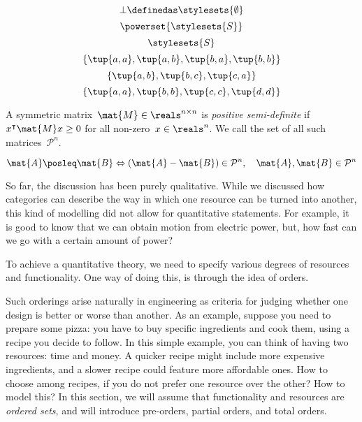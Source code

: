 {\begin{forslides}
\begin{equation*}
\end{equation*}
                \begin{equation*}
        \label{eq:pow_5}
        \bot \definedas \stylesets{\emptyset}
\end{equation*}
\begin{equation*}
        \label{eq:pow_6}
        \powerset{\stylesets{S}}
\end{equation*}
    \begin{equation*}
        \label{eq:pow_7}
        \stylesets{S}
\end{equation*}
    \begin{equation*}
        \label{eq:pre_ex1}
        \{\tup{a,a},\tup{a,b},\tup{b,a},\tup{b,b}\}
\end{equation*}
        \begin{equation*}
        \label{eq:pre_ex2}
        \{\tup{a,b},\tup{b,c},\tup{c,a}\}
\end{equation*}
            \begin{equation*}
        \label{eq:pre_ex3}
        \{\tup{a,a},\tup{b,b},\tup{c,c},\tup{d,d}\}
\end{equation*}
    \begin{definition}
        \label{def:posdef}
        A symmetric matrix~$\mat{M}\in \reals^{n\times n}$ is \emph{positive semi-definite} if~$x^\intercal \mat{M}x\geq 0$ for all non-zero~$x\in \reals^n$. We call the set of all such matrices~$\mathcal{P}^n$.
\end{definition}
    \begin{equation*}
        \label{eq:posdef_1}
        \mat{A}\posleq \mat{B} \Leftrightarrow (\mat{A}-\mat{B})\in \mathcal{P}^n, \quad \mat{A},\mat{B}\in \mathcal{P}^n
\end{equation*}
\end{forslides}}


So far, the discussion has been purely qualitative. While we discussed how
categories can describe the way in which one resource can be turned into another,
this kind of modelling did not allow for quantitative statements. For example, it
is good to know that we can obtain motion from electric power, but, how fast can
we go with a certain amount of power?

To achieve a quantitative theory, we need to specify various degrees of resources and functionality.
One way of doing this, is through the idea of orders.


Such orderings arise naturally in engineering as criteria for judging whether one design is better or worse than another.
As an example, suppose you need to prepare some pizza: you have to buy specific ingredients and cook them, using a recipe you decide to follow.
In this simple example, you can think of having two resources: time and money.
A quicker recipe might include more expensive ingredients, and a slower recipe could feature more affordable ones.
How to choose among recipes, if you do not prefer one resource over the other? How to model this? In this section, we will assume that functionality and resources
are \emph{ordered sets}, and will introduce pre-orders, partial orders, and total orders.

